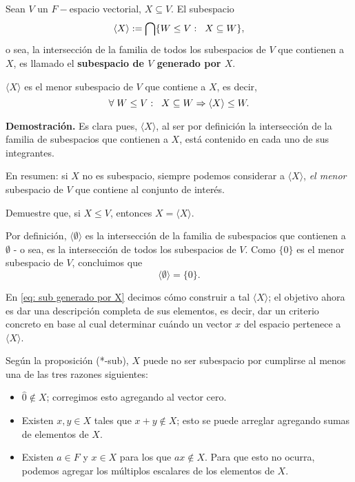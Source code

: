 \begin{defi}
Sean $V$ un $F-$espacio vectorial, $X \subseteq V$. 
El subespacio
\begin{equation}
	\label{eq: sub generado por X}
	\langle X \rangle := \bigcap \{ W \leq V : \hspace{0.2cm}
	X \subseteq W \},
\end{equation}
o sea, la intersección de la familia de todos los subespacios
de $V$ que contienen a $X$, es llamado el 
\textbf{subespacio de $V$ generado por $X$}.
\end{defi}

\begin{prop}
$\langle X \rangle$ es el menor subespacio de $V$
que contiene a $X$, es decir,
\[
\forall \hspace{0.1cm} W \leq V: \hspace{0.2cm}
X \subseteq W \Rightarrow \langle X \rangle \leq W.
\]
\end{prop}
\noindent
\textbf{Demostración.}
Es clara pues, $\langle X \rangle$, al ser por definición
la intersección de la familia de subespacios que
contienen a $X$, está contenido en cada uno de sus integrantes.

\QEDB
\vspace{0.2cm}

En resumen: si $X$ no es subespacio, siempre podemos
considerar a $\langle X \rangle$, \textit{el menor}
subespacio de $V$ que contiene al conjunto de interés.

 Demuestre que, si $X \leq V$,
entonces $X = \langle X \rangle$.

\begin{obs}
Por definición,
$\langle \emptyset \rangle $ es la intersección 
de la familia de subespacios que contienen a 
$\emptyset$ - o sea, es la intersección de todos los subespacios
de $V$. Como $\{ 0 \}$ es el menor subespacio de $V$, concluimos que
\[
\langle \emptyset \rangle = \{ 0 \}.
\] 
\end{obs}

En \eqref{eq: sub generado por X} decimos cómo
construir a tal $\langle X \rangle$; el objetivo ahora es dar
una descripción completa de sus elementos, es decir,
dar un criterio concreto en base al cual determinar
cuándo un vector $x$ del espacio pertenece a 
$\langle X \rangle$.

Según la proposición (*-sub), $X$ puede no ser subespacio
por cumplirse al menos una de las tres razones siguientes:
\begin{itemize}
	\item $\hat{0} \not\in X$; corregimos esto agregando
	al vector cero.
	\item Existen $x, y \in X$ tales que 
	$x+y \not\in X$; esto se puede arreglar agregando
	sumas de elementos de $X$.
	\item Existen $a \in F$ y $x \in X$ para los que
	$ax \not\in X$. Para que esto no ocurra, podemos 
	agregar los múltiplos escalares de los elementos de $X$.
\end{itemize}

